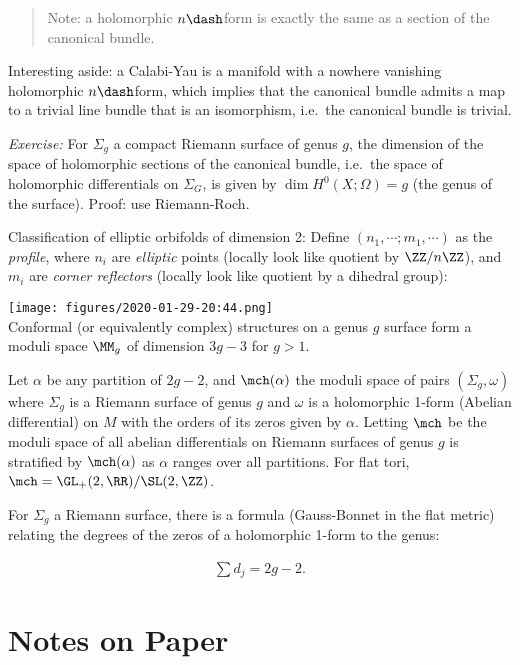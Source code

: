 \begin{quote}
Note: a holomorphic \(n\dash\)form is exactly the same as a section of
the canonical bundle.
\end{quote}

Interesting aside: a Calabi-Yau is a manifold with a nowhere vanishing
holomorphic \(n\dash\)form, which implies that the canonical bundle
admits a map to a trivial line bundle that is an isomorphism, i.e.~the
canonical bundle is trivial.

\emph{Exercise:} For \(\Sigma_g\) a compact Riemann surface of genus
\(g\), the dimension of the space of holomorphic sections of the
canonical bundle, i.e.~the space of holomorphic differentials on
\(\Sigma_G\), is given by \(\dim H^0(X; \Omega) = g\) (the genus of the
surface). Proof: use Riemann-Roch.

Classification of elliptic orbifolds of dimension 2: Define
\((n_1, \cdots; m_1, \cdots)\) as the \emph{profile}, where \(n_i\) are
\emph{elliptic} points (locally look like quotient by \(\ZZ/n\ZZ\)), and
\(m_i\) are \emph{corner reflectors} (locally look like quotient by a
dihedral group):

\texttt{[image: figures/2020-01-29-20:44.png]}\\

Conformal (or equivalently complex) structures on a genus \(g\) surface
form a moduli space \(\MM_g\) of dimension \(3g-3\) for \(g > 1\).

Let \(\alpha\) be any partition of \(2g-2\), and \(\mch(\alpha)\) the
moduli space of pairs \((\Sigma_g, \omega)\) where \(\Sigma_g\) is a
Riemann surface of genus \(g\) and \(\omega\) is a holomorphic 1-form
(Abelian differential) on \(M\) with the orders of its zeros given by
\(\alpha\). Letting \(\mch\) be the moduli space of all abelian
differentials on Riemann surfaces of genus \(g\) is stratified by
\(\mch(\alpha)\) as \(\alpha\) ranges over all partitions. For flat
tori, \(\mch = \GL_+(2, \RR)/\SL(2, \ZZ)\).

For \(\Sigma_g\) a Riemann surface, there is a formula (Gauss-Bonnet in
the flat metric) relating the degrees of the zeros of a holomorphic
1-form to the genus:

\begin{align*}
\sum d_j = 2g-2
.\end{align*}

\hypertarget{notes-on-paper}{%
\section{Notes on Paper}\label{notes-on-paper}}

